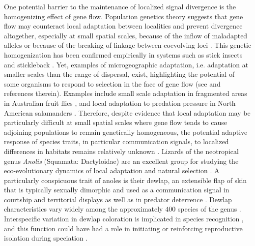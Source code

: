 One potential barrier to the maintenance of localized signal divergence is the homogenizing effect of gene flow. Population genetics theory suggests that gene flow may counteract local adaptation between localities and prevent divergence altogether, especially at small spatial scales, because of the inflow of maladapted alleles or because of the breaking of linkage between coevolving loci \citep{Felsenstein1976, Garcia-Ramos1997, Dieckmann1999, Lenormand2002, Hendry2007}. This genetic homogenization has been confirmed empirically in systems such as stick insects \citep{Nosil2004} and stickleback \citep{Hendry2007a}. Yet, examples of microgeographic adaptation, i.e. adaptation at smaller scales than the range of dispersal, exist, highlighting the potential of some organisms to respond to selection in the face of gene flow (see \citealt{Richardson2014} and references therein). Examples include small scale adaptation in fragmented areas in Australian fruit flies \citep{Willi2012}, and local adaptation to predation pressure in North American salamanders \citep{Richardson2013}. Therefore, despite evidence that local adaptation may be particularly difficult at small spatial scales where gene flow tends to cause adjoining populations to remain genetically homogeneous, the potential adaptive response of species traits, in particular communication signals, to localized differences in habitats remains relatively unknown \citep{Richardson2014}. Lizards of the neotropical genus \textit{Anolis} (Squamata: Dactyloidae) are an excellent group for studying the eco-evolutionary dynamics of local adaptation and natural selection \citep{Losos2009}. A particularly conspicuous trait of anoles is their dewlap, an extensible flap of skin that is typically sexually dimorphic and used as a communication signal in courtship \citep{Sigmund1983, Driessens2014, Driessens2015} and territorial displays \citep{Losos1985, Macedonia1994, Macedonia2013} as well as in predator deterrence \citep{Leal1995, Leal1997, Leal1997a}. Dewlap characteristics vary widely among the approximately $400$ species of the genus \citep{Nicholson2007}. Interspecific variation in dewlap coloration is implicated in species recognition \citep{Rand1970, Williams1969, Williams1977, Losos1985, Macedonia1994, Fleishman2000, Macedonia2013}, and this function could have had a role in initiating or reinforcing reproductive isolation during speciation \citep{Lambert2013, Geneva2015, Ng2017}.\\

